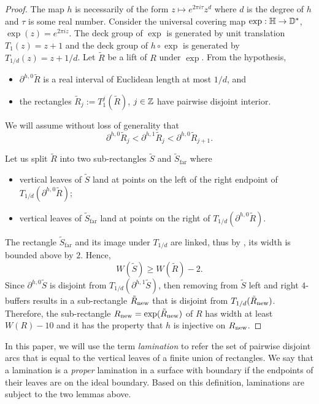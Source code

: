 \documentclass{amsart}
\begin{document}
\begin{proof}
    The map $h$ is necessarily of the form $z \mapsto e^{2\pi i \tau} z^d$ where $d$ is the degree of $h$ and $\tau$ is some real number.
    Consider the universal covering map $\exp: \mathbb{H} \to \mathbb{D}^*$, $\exp(z) = e^{2\pi i z}$.
    The deck group of $\exp$ is generated by unit translation $T_1(z) =z+1$ and the deck group of $h \circ \exp$ is generated by $T_{1/d}(z)= z+1/d$.
    Let $\tilde{R}$ be a lift of $R$ under $\exp$.
    From the hypothesis, 
    \begin{itemize}
        \item $\partial^{h,0} \tilde{R}$ is a real interval of Euclidean length at most $1/d$, and 
        \item the rectangles $\tilde{R}_j := T_1^j(\tilde{R})$, $j \in \mathbb{Z}$ have pairwise disjoint interior.
    \end{itemize}
    We will assume without loss of generality that 
    \[
    \partial^{h,0} \tilde{R}_j < \partial^{h,1} \tilde{R}_j < \partial^{h,0} \tilde{R}_{j+1}.
    \]

    Let us split $\tilde{R}$ into two sub-rectangles $\tilde{S}$ and $\tilde{S}_{\text{far}}$ where 
    \begin{itemize}
        \item vertical leaves of $\tilde{S}$ land at points on the left of the right endpoint of $T_{1/d}(\partial^{h,0} \tilde{R})$;
        \item vertical leaves of $\tilde{S}_{\text{far}}$ land at points on the right of $T_{1/d}(\partial^{h,0} \tilde{R})$.
    \end{itemize}
    The rectangle $\tilde{S}_{\text{far}}$ and its image under $T_{1/d}$ are linked, thus by \cite[Shift Argument]{DL22}, its width is bounded above by $2$. 
    Hence, 
    \[
        W(\tilde{S}) \geq W(\tilde{R}) -  2.
    \]
    Since $\partial^{h,0} \tilde{S}$ is disjoint from $T_{1/d}(\partial^{h,1} \tilde{S})$,
    then removing from $\tilde{S}$ left and right $4$-buffers results in a sub-rectangle $\tilde{R}_{\textnormal{new}}$ that is disjoint from $T_{1/d}(\tilde{R}_{\textnormal{new}})$.
    Therefore, the sub-rectangle $R_{\textnormal{new}} = \exp(\tilde{R}_{\textnormal{new}})$ of $R$ has width at least $W(R) - 10$ and it has the property that $h$ is injective on $R_{\textnormal{new}}$.
\end{proof}

In this paper, we will use the term \emph{lamination} to refer the set of pairwise disjoint arcs that is equal to the vertical leaves of a finite union of rectangles.
We say that a lamination is a \emph{proper} lamination in a surface with boundary if the endpoints of their leaves are on the ideal boundary.
Based on this definition, laminations are subject to the two lemmas above.



 
{\small }
\end{document}
